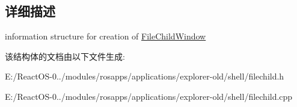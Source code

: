 \subsection{详细描述}
information structure for creation of \hyperlink{struct_file_child_window}{File\+Child\+Window} 

该结构体的文档由以下文件生成\+:\begin{DoxyCompactItemize}
\item 
E\+:/\+React\+O\+S-\/0../modules/rosapps/applications/explorer-\/old/shell/filechild.\+h\item 
E\+:/\+React\+O\+S-\/0../modules/rosapps/applications/explorer-\/old/shell/filechild.\+cpp\end{DoxyCompactItemize}
